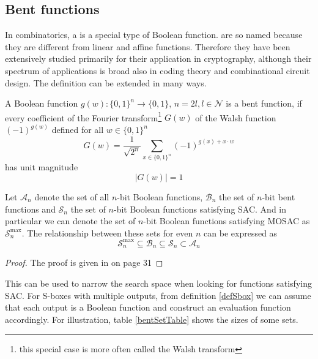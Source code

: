 \subsection{Bent functions}
In \cite{wikiBentFunction} combinatorics, a  is a special type of Boolean function.
 are so named because they are different
from linear and affine functions.
Therefore they have been extensively studied primarily for their application in cryptography,
although their spectrum of applications is broad also in coding theory and combinational circuit design.
The definition can be extended in many ways.

\begin{definition}\cite{yokohama} A Boolean function $g(w): \{0,1\}^n \rightarrow \{0,1\}$,
$n = 2l, l \in \mathcal{N}$ is a bent function,
if every coefficient
of the Fourier transform\footnote{this special case is more often called the Walsh transform}
$G(w)$ of the Walsh function $(-1)^{g(w)}$ defined
for all $w \in \{0,1\}^n$
\begin{equation}
  G(w) = \frac{1}{\sqrt{2^n}}\sum\limits_{x \in \{0,1\}^n}(-1)^{g(x)+x \cdot w}
\end{equation}
has unit magnitude
\begin{equation}
  |G(w)| = 1
\end{equation}
\end{definition}

\begin{theorem}
\label{bentTheorem}
Let $\mathcal{A}_n $ denote the set of all $n$-bit Boolean functions,
$\mathcal{B}_n $ the set of $n$-bit bent functions
and $\mathcal{S}_n $ the set of $n$-bit Boolean functions satisfying SAC.
And in particular we can denote the set of $n$-bit Boolean functions satisfying
MOSAC as $\mathcal{S}^{\max}_n$. The relationship between these sets for even $n$ can be
expressed as
\begin{equation}
  \mathcal{S}^{\max}_n \subseteq \mathcal{B}_n \subseteq \mathcal{S}_n \subset \mathcal{A}_n
\end{equation}
\end{theorem}

\begin{proof}
The proof is given in \cite{yokohama} on page 31
\end{proof}
This can be used to narrow the search space when looking for functions satisfying SAC.
For S-boxes with multiple outputs, from definition \ref{defSbox} we can assume that each output is
a Boolean function and construct an evaluation function accordingly. For illustration, table
\ref{bentSetTable} shows the sizes of some sets.

